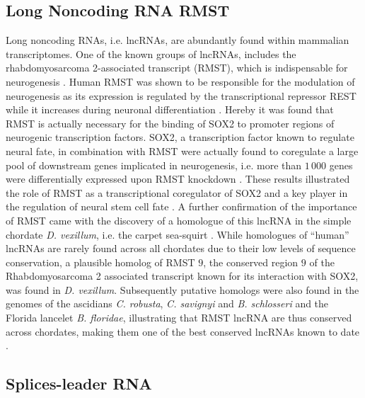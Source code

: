 \documentclass[graybox]{svmult}
\begin{document}
\subsection{Long Noncoding RNA RMST}

Long noncoding RNAs, i.e. lncRNAs, are abundantly found within mammalian 
transcriptomes. One of the known groups of lncRNAs, includes the 
rhabdomyosarcoma 2-associated transcript (RMST), which is indispensable for 
neurogenesis \cite{Bogu2013}. 
Human RMST was shown to be responsible for the modulation of neurogenesis as 
its expression is regulated by the transcriptional repressor REST while it 
increases during neuronal differentiation \cite{Bogu2013}. Hereby it was 
found that RMST is actually necessary for the binding of SOX2 to promoter 
regions of neurogenic transcription factors. SOX2, a transcription factor known 
to regulate neural fate, in combination with RMST were actually found to 
coregulate a large pool of downstream genes implicated in neurogenesis, i.e. 
more than $1\,000$ genes were differentially expressed upon RMST knockdown 
\cite{Bogu2013}. These results illustrated the role of RMST as a 
transcriptional coregulator of SOX2 and a key player in the regulation of 
neural stem cell fate \cite{Bogu2013}. A further confirmation of the importance 
of RMST came with the discovery of a homologue of this lncRNA in the simple 
chordate \textit{D. vexillum}, i.e. the carpet sea-squirt 
\cite{Velandia-Huerto2016}. While homologues of ``human'' lncRNAs are 
rarely found across all chordates due to their low levels of sequence 
conservation, a plausible homolog of RMST $9$, the conserved region $9$ of the 
Rhabdomyosarcoma 2 associated transcript known for its interaction with SOX2, 
was found in \textit{D. vexillum}. Subsequently putative homologs were also 
found in the genomes of the ascidians \textit{C. robusta}, \textit{C. 
savignyi} and \textit{B. schlosseri} and the Florida lancelet \textit{B. 
floridae}, illustrating that RMST lncRNA are thus conserved across chordates, 
making them one of the best conserved lncRNAs known to date 
\cite{Velandia-Huerto2016}.

\subsection{Splices-leader RNA}
\end{document}
